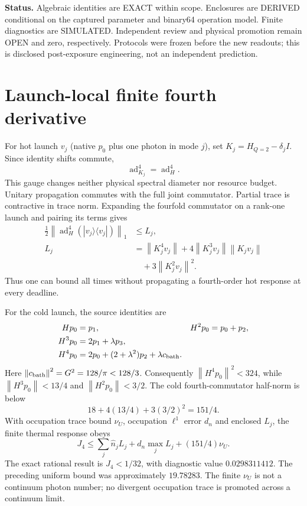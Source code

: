 \documentclass[a4paper,conference]{IEEEtran}
\newcommand{\ad}{\operatorname{ad}}
\newcommand{\norm}[1]{\left\|#1\right\|}
\begin{document}
\textbf{Status.} Algebraic identities are EXACT within scope. Enclosures are DERIVED conditional on the captured parameter and binary64 operation model. Finite diagnostics are SIMULATED. Independent review and physical promotion remain OPEN and zero, respectively. Protocols were frozen before the new readouts; this is disclosed post-exposure engineering, not an independent prediction.

\section{Launch-local finite fourth derivative}
For hot launch $v_j$ (native $p_0$ plus one photon in mode $j$), set $K_j=H_{Q=2}-\delta_j I$. Since identity shifts commute,
\begin{equation}
\ad_{K_j}^4=\ad_H^4.
\end{equation}
This gauge changes neither physical spectral diameter nor resource budget. Unitary propagation commutes with the full joint commutator. Partial trace is contractive in trace norm. Expanding the fourfold commutator on a rank-one launch and pairing its terms gives
\begin{align}
\tfrac12\norm{\ad_H^4(|v_j\rangle\langle v_j|)}_1
&\le L_j,\\
L_j&=\norm{K_j^4v_j}+4\norm{K_j^3v_j}\norm{K_jv_j}\\
 &\quad+3\norm{K_j^2v_j}^2.
\end{align}
Thus one can bound all times without propagating a fourth-order hot response at every deadline.

For the cold launch, the source identities are
\begin{align}
Hp_0&=p_1, &H^2p_0&=p_0+p_2,\\
H^3p_0&=2p_1+\lambda p_3,\\
H^4p_0&=2p_0+(2+\lambda^2)p_2+\lambda c_{\rm bath}.
\end{align}
Here $\norm{c_{\rm bath}}^2=G^2=128/\pi<128/3$. Consequently $\norm{H^4p_0}^2<324$, while $\norm{H^3p_0}<13/4$ and $\norm{H^2p_0}<3/2$. The cold fourth-commutator half-norm is below
\begin{equation}
18+4(13/4)+3(3/2)^2=151/4.
\end{equation}
With occupation trace bound $\nu_U$, occupation $\ell^1$ error $d_n$ and enclosed $L_j$, the finite thermal response obeys
\begin{equation}
J_4\le\sum_j\widehat n_j L_j+d_n\max_j L_j+(151/4)\nu_U.
\end{equation}
The exact rational result is $J_4<1/32$, with diagnostic value $0.0298311412$. The preceding uniform bound was approximately $19.78283$. The finite $\nu_U$ is not a continuum photon number; no divergent occupation trace is promoted across a continuum limit.
\end{document}
